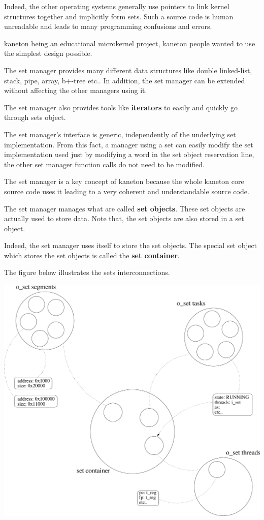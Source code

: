 \begin{multicols}{2}
Indeed, the other operating systems generally use pointers to link kernel
structures together and implicitly form sets. Such a source code is human
unreadable and leads to many programming confusions and errors.

kaneton being an educational microkernel project, kaneton people wanted
to use the simplest design possible.

The set manager provides many different data structures like double
linked-list, stack, pipe, array, b+-tree etc.. In addition, the set
manager can be extended without affecting the other managers using it.

The set manager also provides tools like \textbf{iterators} to easily and
quickly go through sets object.

The set manager's interface is generic, independently of the underlying set
implementation. From this fact, a manager using a set can easily modify
the set implementation used just by modifying a word in the set
object reservation line, the other set manager function calls do not
need to be modified.

The set manager is a key concept of kaneton because the whole kaneton
core source code uses it leading to a very coherent and understandable
source code.

The set manager manages what are called \textbf{set objects}. These set
objects are actually used to store data. Note that, the set objects are
also stored in a set object.

Indeed, the set manager uses itself to store the set objects. The special
set object which stores the set objects is called the \textbf{set container}.

The figure below illustrates the sets interconnections.

\end{multicols}

\begin{center}
  \includegraphics[scale=0.5]{figures/sets.pdf}
\end{center}

